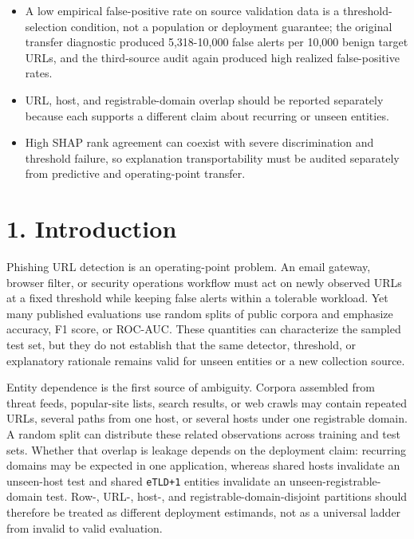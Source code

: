 \documentclass[
  10pt,
]{article}
\providecommand{\tightlist}{%
  \setlength{\itemsep}{0pt}\setlength{\parskip}{0pt}}
\begin{document}
\begin{itemize}
\tightlist
\item
  A low empirical false-positive rate on source validation data is a
  threshold-selection condition, not a population or deployment
  guarantee; the original transfer diagnostic produced 5,318-10,000
  false alerts per 10,000 benign target URLs, and the third-source audit
  again produced high realized false-positive rates.
\item
  URL, host, and registrable-domain overlap should be reported
  separately because each supports a different claim about recurring or
  unseen entities.
\item
  High SHAP rank agreement can coexist with severe discrimination and
  threshold failure, so explanation transportability must be audited
  separately from predictive and operating-point transfer.
\end{itemize}

\section{1. Introduction}\label{introduction}

Phishing URL detection is an operating-point problem. An email gateway,
browser filter, or security operations workflow must act on newly
observed URLs at a fixed threshold while keeping false alerts within a
tolerable workload. Yet many published evaluations use random splits of
public corpora and emphasize accuracy, F1 score, or
ROC-AUC\citep{Zieni2023, Mamun2016, Prasad2024, Opara2024, Le2018URLNet, Mahesh2026, Rashid2024, Yi2026, Mia2024, Ahamed2026}.
These quantities can characterize the sampled test set, but they do not
establish that the same detector, threshold, or explanatory rationale
remains valid for unseen entities or a new collection source.

Entity dependence is the first source of ambiguity. Corpora assembled
from threat feeds, popular-site lists, search results, or web crawls may
contain repeated URLs, several paths from one host, or several hosts
under one registrable domain. A random split can distribute these
related observations across training and test sets. Whether that overlap
is leakage depends on the deployment claim: recurring domains may be
expected in one application, whereas shared hosts invalidate an
unseen-host test and shared \texttt{eTLD+1} entities invalidate an
unseen-registrable-domain
test\citep{Dalton2025, Kaufman2012, Kapoor2023, Arp2022, Pendlebury2019}.
Row-, URL-, host-, and registrable-domain-disjoint partitions should
therefore be treated as different deployment estimands, not as a
universal ladder from invalid to valid evaluation.
\end{document}
